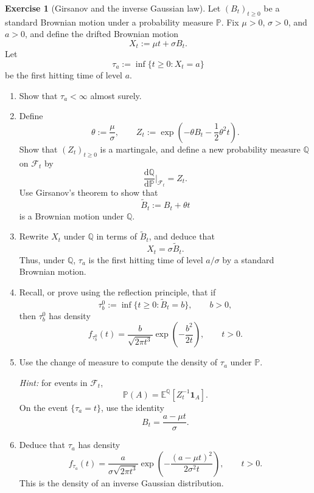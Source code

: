 \documentclass[11pt]{article}
\theoremstyle{plain}
\theoremstyle{definition}
\newtheorem{exercise}[theorem]{Exercise}
\theoremstyle{remark}
\begin{document}
\begin{exercise}[Girsanov and the inverse Gaussian law]
Let $(B_t)_{t\ge 0}$ be a standard Brownian motion under a probability measure $\mathbb{P}$.
Fix $\mu>0$, $\sigma>0$, and $a>0$, and define the drifted Brownian motion
\[
X_t := \mu t + \sigma B_t.
\]
Let
\[
\tau_a := \inf\{t\ge 0 : X_t = a\}
\]
be the first hitting time of level $a$.

\begin{enumerate}[leftmargin=1.5em, label=(\alph*)]

\item Show that $\tau_a<\infty$ almost surely.

\item Define
\[
\theta := \frac{\mu}{\sigma},
\qquad
Z_t := \exp\left(-\theta B_t - \frac12 \theta^2 t\right).
\]
Show that $(Z_t)_{t\ge 0}$ is a martingale, and define a new probability measure $\mathbb{Q}$ on $\mathcal{F}_t$ by
\[
\frac{\mathrm{d}\mathbb{Q}}{\mathrm{d}\mathbb{P}}\Big|_{\mathcal{F}_t}
= Z_t.
\]
Use Girsanov's theorem to show that
\[
\widetilde B_t := B_t + \theta t
\]
is a Brownian motion under $\mathbb{Q}$.

\item Rewrite $X_t$ under $\mathbb{Q}$ in terms of $\widetilde B_t$, and deduce that
\[
X_t = \sigma \widetilde B_t.
\]
Thus, under $\mathbb{Q}$, $\tau_a$ is the first hitting time of level $a/\sigma$ by a standard Brownian motion.

\item Recall, or prove using the reflection principle, that if
\[
\tau_b^0 := \inf\{t\ge 0 : \widetilde B_t=b\},
\qquad b>0,
\]
then $\tau_b^0$ has density
\[
f_{\tau_b^0}(t)
=
\frac{b}{\sqrt{2\pi t^3}}
\exp\left(-\frac{b^2}{2t}\right),
\qquad t>0.
\]

\item Use the change of measure to compute the density of $\tau_a$ under $\mathbb{P}$.

\textit{Hint:} for events in $\mathcal{F}_t$,
\[
\mathbb{P}(A)=\mathbb{E}^{\mathbb{Q}}\left[Z_t^{-1}\mathbf 1_A\right].
\]
On the event $\{\tau_a=t\}$, use the identity
\[
B_t = \frac{a-\mu t}{\sigma}.
\]

\item Deduce that $\tau_a$ has density
\[
f_{\tau_a}(t)
=
\frac{a}{\sigma\sqrt{2\pi t^3}}
\exp\left(
-\frac{(a-\mu t)^2}{2\sigma^2 t}
\right),
\qquad t>0.
\]
This is the density of an inverse Gaussian distribution.

\end{enumerate}
\end{exercise}
\end{document}
